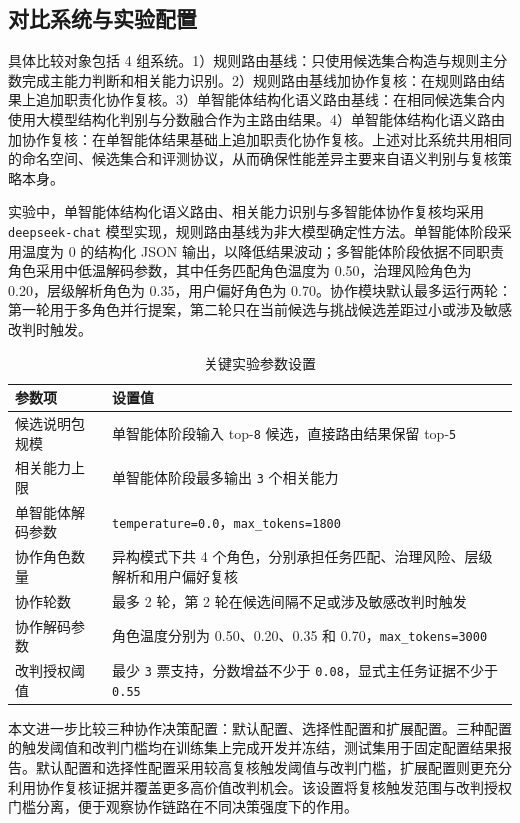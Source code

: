 \documentclass[10pt,a4paper,twocolumn,fontset=fandol]{ctexart}
\begin{document}
\subsection{对比系统与实验配置}

具体比较对象包括 4 组系统。1）规则路由基线：只使用候选集合构造与规则主分数完成主能力判断和相关能力识别。2）规则路由基线加协作复核：在规则路由结果上追加职责化协作复核。3）单智能体结构化语义路由基线：在相同候选集合内使用大模型结构化判别与分数融合作为主路由结果。4）单智能体结构化语义路由加协作复核：在单智能体结果基础上追加职责化协作复核。上述对比系统共用相同的命名空间、候选集合和评测协议，从而确保性能差异主要来自语义判别与复核策略本身。

实验中，单智能体结构化语义路由、相关能力识别与多智能体协作复核均采用 \texttt{deepseek-chat} 模型实现，规则路由基线为非大模型确定性方法。单智能体阶段采用温度为 0 的结构化 JSON 输出，以降低结果波动；多智能体阶段依据不同职责角色采用中低温解码参数，其中任务匹配角色温度为 0.50，治理风险角色为 0.20，层级解析角色为 0.35，用户偏好角色为 0.70。协作模块默认最多运行两轮：第一轮用于多角色并行提案，第二轮只在当前候选与挑战候选差距过小或涉及敏感改判时触发。

\begin{table}[htbp]
\centering
\caption{关键实验参数设置}
\label{tab:params}
\small
\begin{tabularx}{\columnwidth}{lY}
\toprule
参数项 & 设置值 \\
\midrule
候选说明包规模 & 单智能体阶段输入 top-\texttt{8} 候选，直接路由结果保留 top-\texttt{5} \\
相关能力上限 & 单智能体阶段最多输出 \texttt{3} 个相关能力 \\
单智能体解码参数 & \texttt{temperature=0.0}，\texttt{max\_tokens=1800} \\
协作角色数量 & 异构模式下共 4 个角色，分别承担任务匹配、治理风险、层级解析和用户偏好复核 \\
协作轮数 & 最多 2 轮，第 2 轮在候选间隔不足或涉及敏感改判时触发 \\
协作解码参数 & 角色温度分别为 0.50、0.20、0.35 和 0.70，\texttt{max\_tokens=3000} \\
改判授权阈值 & 最少 \texttt{3} 票支持，分数增益不少于 \texttt{0.08}，显式主任务证据不少于 \texttt{0.55} \\
\bottomrule
\end{tabularx}
\end{table}

本文进一步比较三种协作决策配置：默认配置、选择性配置和扩展配置。三种配置的触发阈值和改判门槛均在训练集上完成开发并冻结，测试集用于固定配置结果报告。默认配置和选择性配置采用较高复核触发阈值与改判门槛，扩展配置则更充分利用协作复核证据并覆盖更多高价值改判机会。该设置将复核触发范围与改判授权门槛分离，便于观察协作链路在不同决策强度下的作用。
\end{document}
